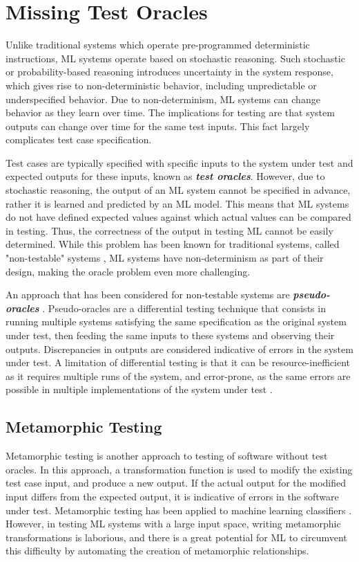 \documentclass[letterpaper]{article} %
\begin{document}
\section{Missing Test Oracles}
Unlike traditional systems which operate pre-programmed deterministic instructions, ML systems operate based on stochastic reasoning. Such stochastic or probability-based reasoning introduces uncertainty in the system response, which gives rise to non-deterministic behavior, including unpredictable or underspecified behavior. Due to non-determinism, ML systems can change behavior as they learn over time. The implications for testing are that system outputs can change over time for the same test inputs. This fact largely complicates test case specification. 

Test cases are typically specified with specific inputs to the system under test and expected outputs for these inputs, known as \textit{\textbf{test oracles}}. However, due to stochastic reasoning, the output of an ML system cannot be specified in advance, rather it is learned and predicted by an ML model. This means that ML systems do not have defined expected values against which actual values can be compared in testing. Thus, the correctness of the output in testing ML cannot be easily determined. While this problem has been known for traditional systems, called "non-testable" systems \cite{Weyuker1982}, ML systems have non-determinism as part of their design, making the oracle problem even more challenging.

An approach that has been considered for non-testable systems are \textit{\textbf{pseudo-oracles}} \cite{Weyuker1982}.  
Pseudo-oracles are a differential testing technique that consists in running multiple systems satisfying the same specification as the original system under test, then feeding the same inputs to these systems and observing their outputs. Discrepancies in outputs are considered indicative of errors in the system under test. A limitation of differential testing is that it can be resource-inefficient as it requires multiple runs of the system, and error-prone, as the same errors are possible in multiple implementations of the system under test \cite{Knight1986}. 

\subsection{Metamorphic Testing}
Metamorphic testing is another approach to testing of software without test oracles. In this approach, a transformation function is used to modify the existing test case input, and produce a new output. If the actual output for the modified input differs from the expected output, it is indicative of errors in the software under test. Metamorphic testing has been applied to machine learning classifiers \cite{Xie2011} \cite{Dwarakanath2018}. However, in testing ML systems with a large input space, writing metamorphic transformations is laborious, and there is a great potential for ML to circumvent this difficulty by automating the creation of metamorphic relationships.
\end{document}

